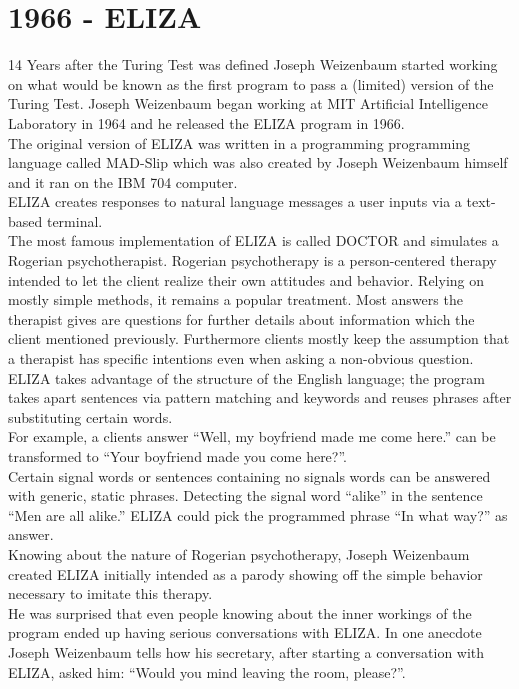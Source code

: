\section{1966 - ELIZA}

14 Years after the Turing Test was defined Joseph Weizenbaum started working on what would be known as the first program to pass a (limited) version of the Turing Test. Joseph Weizenbaum began working at MIT Artificial Intelligence Laboratory in 1964 and he released the ELIZA program in 1966.
\\

The original version of ELIZA was written in a programming programming language called MAD-Slip which was also created by Joseph Weizenbaum himself and it ran on the IBM 704 computer.
\\
ELIZA creates responses to natural language messages a user inputs via a text-based terminal.
\\

The most famous implementation of ELIZA is called DOCTOR and simulates a Rogerian psychotherapist. Rogerian psychotherapy is a person-centered therapy intended to let the client realize their own attitudes and behavior. Relying on mostly simple methods, it remains a popular treatment. Most answers the therapist gives are questions for further details about information which the client mentioned previously. Furthermore clients mostly keep the assumption that a therapist has specific intentions even when asking a non-obvious question.
\\

ELIZA takes advantage of the structure of the English language; the program takes apart sentences via pattern matching and keywords and reuses phrases after substituting certain words.
\\
For example, a clients answer ``Well, my boyfriend made me come here.'' can be transformed to ``Your boyfriend made you come here?''\cite{elizatest}.
\\
Certain signal words or sentences containing no signals words can be answered with generic, static phrases. Detecting the signal word ``alike'' in the sentence ``Men are all alike.'' ELIZA could pick the programmed phrase ``In what way?'' as answer\cite{elizatest}.
\\

Knowing about the nature of Rogerian psychotherapy, Joseph Weizenbaum created ELIZA initially intended as a parody showing off the simple behavior necessary to imitate this therapy.
\\
He was surprised that even people knowing about the inner workings of the program ended up having serious conversations with ELIZA. In one anecdote Joseph Weizenbaum tells how his secretary, after starting a conversation with ELIZA, asked him: ``Would you mind leaving the room, please?''\cite[5]{weizenbaum}.
\\


